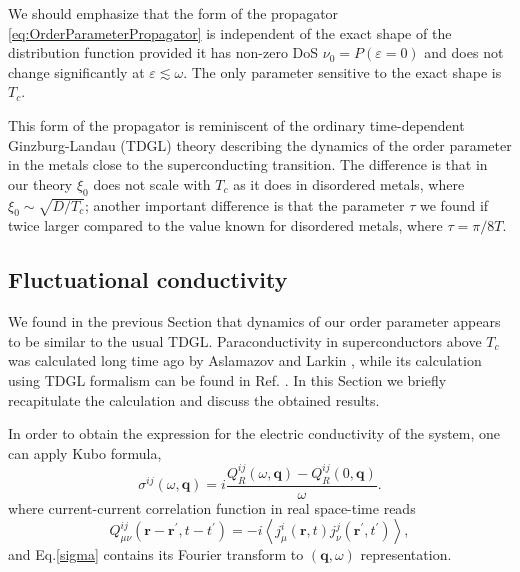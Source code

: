 \documentclass[twocolumn,english,prb]{revtex4-1}
\begin{document}
We should emphasize that the form of the propagator \eqref{eq:OrderParameterPropagator} is independent of the exact shape of the distribution function provided it has non-zero DoS $\nu_0 = P(\varepsilon = 0)$ and does not change significantly at $\varepsilon \lesssim \omega$. The only parameter sensitive to the exact shape is $T_c$.

This form of the propagator is reminiscent of the ordinary time-dependent Ginzburg-Landau (TDGL)\cite{VarlamovLarkin} theory describing the dynamics of the order parameter in the metals close to the superconducting transition. 
The difference is that in our theory $\xi_0$ does not scale with $T_c$ as it does in disordered metals, 
where $\xi_0 \sim \sqrt{D / T_c}$;
another important difference is that the  parameter $\tau$ we found if  twice larger compared to the value 
known for disordered metals, where $\tau = \pi / 8 T$.

\subsection{Fluctuational conductivity}
\label{sec:MeanFieldConductivity}

We found in the previous Section that dynamics of our order parameter appears to be similar to the usual TDGL.  Paraconductivity in superconductors above $T_c$ was calculated long time ago by Aslamazov and Larkin \cite{AslamazovLarkin}, while its calculation using TDGL formalism can be found in Ref. \cite{VarlamovLarkin}. In this Section we briefly recapitulate  the calculation and discuss the obtained results. 

In order to obtain the expression for the electric conductivity of the system, one can apply Kubo formula,
\begin{equation}
\label{sigma}
\sigma^{i j}(\omega,\boldsymbol{q})=i\frac{Q_{R}^{i j}(\omega,\boldsymbol{q})-Q_{R}^{i j}(0,\boldsymbol{q})}{\omega}.
\end{equation}
where current-current correlation function in real space-time reads
\begin{equation}
\label{eq:Qkernel}
Q_{\mu \nu}^{i j}(\boldsymbol{r}-\boldsymbol{r}^{\prime},t-t^{\prime})=-i\left\langle j_{\mu}^{i}(\boldsymbol{r},t)j_{\nu}^{j}(\boldsymbol{r}^{\prime},t^{\prime})\right\rangle,
\end{equation}
and  Eq.\eqref{sigma} contains its Fourier transform to $(\boldsymbol{q},\omega)$ representation.
\end{document}
